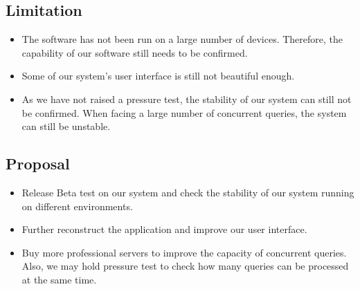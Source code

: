 \documentclass[10pt]{article}
\begin{document}
\subsection{Limitation}
\begin{itemize}
	\item The software has not been run on a large number of devices. Therefore, the capability of our software still needs to be confirmed.
	\item	Some of our system’s user interface is still not beautiful enough.
	\item	As we have not raised a pressure test, the stability of our system can still not be confirmed. When facing a large number of concurrent queries, the system can still be unstable.
	
\end{itemize}


\subsection{Proposal}
\begin{itemize}
	\item Release Beta test on our system and check the stability of our system running on different environments.
	\item	Further reconstruct the application and improve our user interface.
	\item Buy more professional servers to improve the capacity of concurrent queries. Also, we may hold pressure test to check how many queries can be processed at the same time.
	
\end{itemize}
\end{document}
